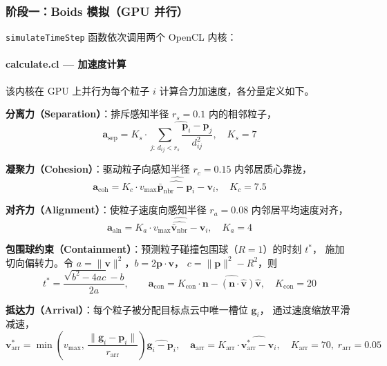 \subsubsection{阶段一：Boids 模拟（GPU 并行）}

\texttt{simulateTimeStep} 函数依次调用两个 OpenCL 内核：

\paragraph{calculate.cl — 加速度计算}
该内核在 GPU 上并行为每个粒子 $i$ 计算合力加速度，各分量定义如下。

\textbf{分离力（Separation）}：排斥感知半径 $r_s=0.1$ 内的相邻粒子，
\begin{equation}
  \mathbf{a}_{\mathrm{sep}} = K_s \cdot
  \widehat{\sum_{j:\,d_{ij}<r_s}
  \frac{\mathbf{p}_i - \mathbf{p}_j}{d_{ij}^2}}, \quad K_s = 7
\end{equation}

\textbf{凝聚力（Cohesion）}：驱动粒子向感知半径 $r_c=0.15$ 内邻居质心靠拢，
\begin{equation}
  \mathbf{a}_{\mathrm{coh}} = K_c \cdot
  \widehat{v_{\max}\widehat{\bar{\mathbf{p}}_{\mathrm{nbr}}-\mathbf{p}_i}
  - \mathbf{v}_i}, \quad K_c = 7.5
\end{equation}

\textbf{对齐力（Alignment）}：使粒子速度向感知半径 $r_a=0.08$ 内邻居平均速度对齐，
\begin{equation}
  \mathbf{a}_{\mathrm{aln}} = K_a \cdot
  \widehat{v_{\max}\widehat{\bar{\mathbf{v}}_{\mathrm{nbr}}} - \mathbf{v}_i},
  \quad K_a = 4
\end{equation}

\textbf{包围球约束（Containment）}：预测粒子碰撞包围球（$R=1$）的时刻 $t^*$，
施加切向偏转力。令 $a=\|\mathbf{v}\|^2$，$b=2\mathbf{p}\cdot\mathbf{v}$，
$c=\|\mathbf{p}\|^2-R^2$，则
\begin{equation}
  t^* = \frac{\sqrt{b^2-4ac}-b}{2a}, \qquad
  \mathbf{a}_{\mathrm{con}} = K_{\mathrm{con}} \cdot
  \widehat{\mathbf{n}-(\mathbf{n}\cdot\hat{\mathbf{v}})\hat{\mathbf{v}}},
  \quad K_{\mathrm{con}}=20
\end{equation}

\textbf{抵达力（Arrival）}：每个粒子被分配目标点云中唯一槽位 $\mathbf{g}_i$，
通过速度缩放平滑减速，
\begin{equation}
  \mathbf{v}^*_{\mathrm{arr}} =
  \min\!\left(v_{\max},\,
  \frac{\|\mathbf{g}_i-\mathbf{p}_i\|}{r_{\mathrm{arr}}}\right)
  \widehat{\mathbf{g}_i-\mathbf{p}_i}, \quad
  \mathbf{a}_{\mathrm{arr}} = K_{\mathrm{arr}} \cdot
  \widehat{\mathbf{v}^*_{\mathrm{arr}}-\mathbf{v}_i},
  \quad K_{\mathrm{arr}}=70,\; r_{\mathrm{arr}}=0.05
\end{equation}

